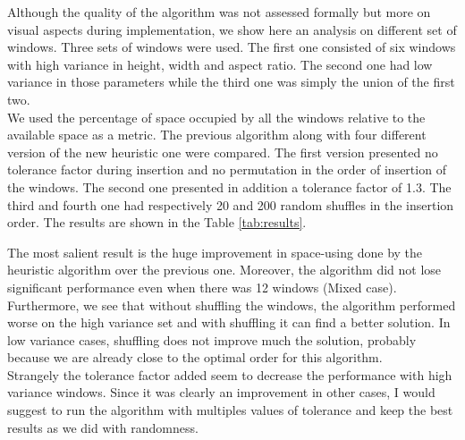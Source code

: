 \documentclass{acmtog}
\begin{document}
Although the quality of the algorithm was not assessed formally  but more on visual aspects during implementation,  we show here an analysis on different set of windows. Three sets of windows were used. The first one consisted of six windows with high variance in height, width and aspect ratio. The second one had low variance in those parameters while the third one was simply the union of the first two. \\
We used the percentage of space occupied by all the windows relative to the available space as a metric. The previous algorithm along with four different version of the new heuristic one were compared. The first version presented no tolerance factor during insertion and no permutation in the order of insertion of the windows. The second one presented in addition a tolerance factor of 1.3. The third and fourth one had respectively 20 and 200 random shuffles in the insertion order. The results are shown in the Table \ref{tab:results}. \\


\begin{table}[t]
\label{tab:results}
\end{table}

The most salient result is the huge improvement in space-using done by the heuristic algorithm over the previous one. Moreover, the algorithm did not lose significant performance even when there was 12 windows (Mixed case). \\
Furthermore, we see that without shuffling the windows, the algorithm performed worse on the high variance set and with shuffling it can find a better solution. In low variance cases, shuffling does not improve much the solution, probably because we are already close to the optimal order for this algorithm. \\ 
Strangely the tolerance factor added seem to decrease the performance with high variance windows. Since it was clearly an improvement in other cases, I would suggest to run the algorithm with multiples values of tolerance and keep the best results as we did with randomness.
\end{document}
